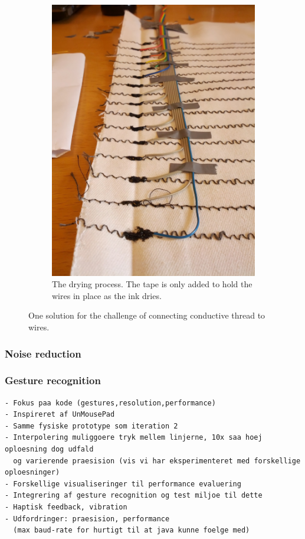 \begin{figure}[h]
\begin{subfigure}[t]{.45\textwidth}
  \includegraphics[width=.9\linewidth]{figures/touch/connectors}
  \caption{The drying process. The tape is only added to hold the wires in place as the ink dries.}
\end{subfigure}
\caption{One solution for the challenge of connecting conductive thread to wires.}
\label{interpolation}
\end{figure}

\subsubsection{Noise reduction}
\subsubsection{Gesture recognition} 


\begin{verbatim}
- Fokus paa kode (gestures,resolution,performance)
- Inspireret af UnMousePad
- Samme fysiske prototype som iteration 2
- Interpolering muliggoere tryk mellem linjerne, 10x saa hoej oploesning dog udfald 
  og varierende praesision (vis vi har eksperimenteret med forskellige oploesninger)
- Forskellige visualiseringer til performance evaluering
- Integrering af gesture recognition og test miljoe til dette
- Haptisk feedback, vibration
- Udfordringer: praesision, performance 
  (max baud-rate for hurtigt til at java kunne foelge med)
\end{verbatim}